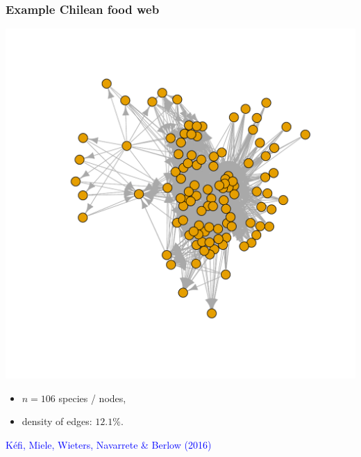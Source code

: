 \documentclass[nopagenumber,9pt]{beamer}
\begin{document}
\begin{frame}
 \frametitle{Example Chilean food web}
 
\begin{center}
\includegraphics[scale=.3]{plots/chilean_food_web.pdf} 
\end{center}

\begin{itemize}
 \item $n=106$ species / nodes,
 \item density of edges: $12.1\%$.
\end{itemize}


\textcolor{blue}{Kéfi, Miele, Wieters, Navarrete \& Berlow (2016)}

\end{frame}
\end{document}
